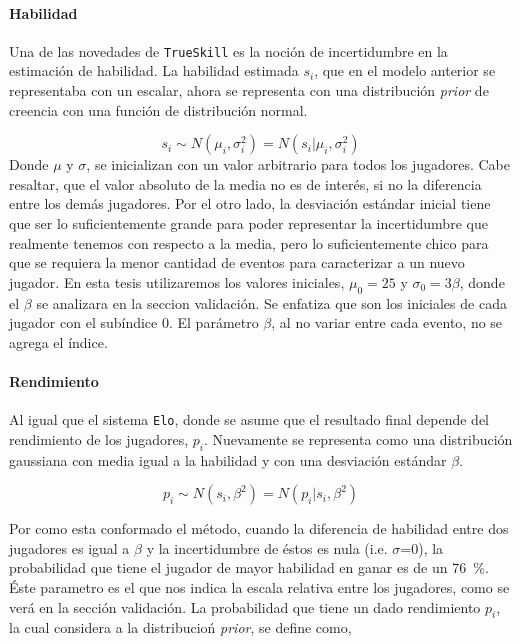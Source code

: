 \documentclass[11pt,twoside,spanish]{report} %
\begin{document}
\paragraph{Habilidad}
Una de las novedades de \texttt{TrueSkill} es la noci\'on de incertidumbre en la estimaci\'on de habilidad.
La habilidad estimada $s_i$, que en el modelo anterior se representaba con un escalar, ahora se representa con una distribuci\'on \textit{prior} de creencia con una funci\'on de distribuci\'on normal.



\begin{equation}
s_i \sim N(\mu_i, \sigma_i^2) = N(s_i|\mu_i, \sigma_i^2)
\end{equation}
Donde $\mu$ y $\sigma$, se inicializan con un valor arbitrario para todos los jugadores.
Cabe resaltar, que el valor absoluto de la media no es de inter\'es, si no la diferencia entre los dem\'as jugadores.
Por el otro lado, la desviaci\'on est\'andar inicial tiene que ser lo suficientemente grande para poder representar la incertidumbre que realmente tenemos con respecto a la media, pero lo suficientemente chico para que se requiera la menor cantidad de eventos para caracterizar a un nuevo jugador.
En esta tesis utilizaremos los valores iniciales, $ \mu_0 = 25 $ y $ \sigma_0=3\beta$, donde el $\beta$ se analizara en la seccion validaci\'on.
Se enfatiza que son los iniciales de cada jugador con el sub\'indice 0.
El par\'ametro $\beta$, al no variar entre cada evento, no se agrega el \'indice.



\paragraph{Rendimiento}
Al igual que el sistema \texttt{Elo}, donde se asume que el resultado final depende del rendimiento de los jugadores, $p_i$.
Nuevamente se representa como una distribuci\'on gaussiana con media igual a la habilidad y con una desviaci\'on est\'andar $\beta$.

\begin{equation}
p_i \sim N(s_i, \beta^2) = N(p_i|s_i, \beta^2)
\end{equation}

Por como esta conformado el m\'etodo, cuando la diferencia de habilidad entre dos jugadores es igual a $\beta$ y la incertidumbre de \'estos es nula (i.e. $\sigma$=0), la probabilidad que tiene el jugador de mayor habilidad en ganar es de un \SI{76}{\percent}.
\'Este parametro es el que nos indica la escala relativa entre los jugadores, como se ver\'a en la secci\'on validaci\'on.
La probabilidad  que tiene un dado rendimiento $p_i$, la cual considera a la distribucio\'n  \textit{prior}, se define como,
\end{document}
